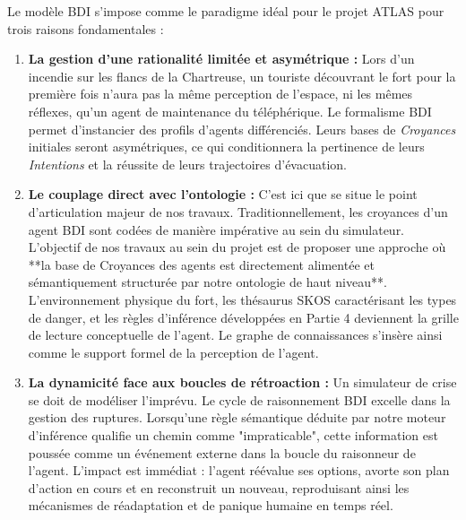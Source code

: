 \documentclass{article}
\begin{document}
Le modèle BDI s'impose comme le paradigme idéal pour le projet ATLAS pour trois raisons fondamentales :

\begin{enumerate}
    \item \textbf{La gestion d'une rationalité limitée et asymétrique :} Lors d'un incendie sur les flancs de la Chartreuse, un touriste découvrant le fort pour la première fois n'aura pas la même perception de l'espace, ni les mêmes réflexes, qu'un agent de maintenance du téléphérique. Le formalisme BDI permet d'instancier des profils d'agents différenciés. Leurs bases de \textit{Croyances} initiales seront asymétriques, ce qui conditionnera la pertinence de leurs \textit{Intentions} et la réussite de leurs trajectoires d'évacuation.
    \item \textbf{Le couplage direct avec l'ontologie :} C'est ici que se situe le point d'articulation majeur de nos travaux. Traditionnellement, les croyances d'un agent BDI sont codées de manière impérative au sein du simulateur. L'objectif de nos travaux au sein du projet est de proposer une approche où **la base de Croyances des agents est directement alimentée et sémantiquement structurée par notre ontologie de haut niveau**. L'environnement physique du fort, les thésaurus SKOS caractérisant les types de danger, et les règles d'inférence développées en Partie 4 deviennent la grille de lecture conceptuelle de l'agent. Le graphe de connaissances s'insère ainsi comme le support formel de la perception de l'agent.
    \item \textbf{La dynamicité face aux boucles de rétroaction :} Un simulateur de crise se doit de modéliser l'imprévu. Le cycle de raisonnement BDI excelle dans la gestion des ruptures. Lorsqu'une règle sémantique déduite par notre moteur d'inférence qualifie un chemin comme "impraticable", cette information est poussée comme un événement externe dans la boucle du raisonneur de l'agent. L'impact est immédiat : l'agent réévalue ses options, avorte son plan d'action en cours et en reconstruit un nouveau, reproduisant ainsi les mécanismes de réadaptation et de panique humaine en temps réel.
\end{enumerate}
\end{document}
